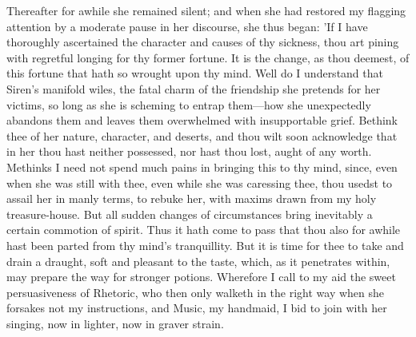 
Thereafter for awhile she remained silent; and when she had restored my
flagging attention by a moderate pause in her discourse, she thus began:
'If I have thoroughly ascertained the character and causes of thy
sickness, thou art pining with regretful longing for thy former fortune.
It is the change, as thou deemest, of this fortune that hath so wrought
upon thy mind. Well do I understand that Siren's manifold wiles, the
fatal charm of the friendship she pretends for her victims, so long as
she is scheming to entrap them—how she unexpectedly abandons them and
leaves them overwhelmed with insupportable grief. Bethink thee of her
nature, character, and deserts, and thou wilt soon acknowledge that in
her thou hast neither possessed, nor hast thou lost, aught of any worth.
Methinks I need not spend much pains in bringing this to thy mind,
since, even when she was still with thee, even while she was caressing
thee, thou usedst to assail her in manly terms, to rebuke her, with
maxims drawn from my holy treasure-house. But all sudden changes of
circumstances bring inevitably a certain commotion of spirit. Thus it
hath come to pass that thou also for awhile hast been parted from thy
mind's tranquillity. But it is time for thee to take and drain a
draught, soft and pleasant to the taste, which, as it penetrates within,
may prepare the way for stronger potions. Wherefore I call to my aid the
sweet persuasiveness of Rhetoric, who then only walketh in the right way
when she forsakes not my instructions, and Music, my handmaid, I bid to
join with her singing, now in lighter, now in graver strain.

